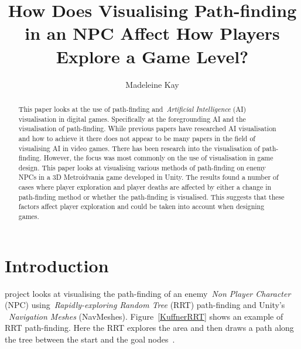 \documentclass[journal]{IEEEtran}
\begin{document}
	\title{ How Does Visualising Path-finding in an NPC Affect How Players Explore a Game Level?}
	\author{Madeleine Kay}
	
	
	\maketitle
	
	\begin{abstract}
		This paper looks at the use of path-finding and~\textit{Artificial Intelligence} (AI) visualisation in digital games.   Specifically at the foregrounding AI and the visualisation of path-finding. 
		While previous papers have researched AI visualisation and how to achieve it there does not appear to be many papers in the field of visualising AI in video games.  There has been research into the visualisation of path-finding. However, the focus was most commonly on the use of visualisation in game design. 
		This paper looks at visualising various methods of path-finding on enemy NPCs in a 3D Metroidvania game developed in Unity.
		The results found a number of cases where player exploration and player deaths are affected by either a change in path-finding method or whether the path-finding is visualised. This suggests that these factors affect player exploration and could be taken into account when designing games.  
	\end{abstract}
	
	\section{Introduction} \label{introduction}
	 project looks at visualising the path-finding of an enemy~\textit{Non Player Character} (NPC) using~\textit{Rapidly-exploring Random Tree} (RRT) path-finding and Unity's ~\textit{Navigation Meshes} (NavMeshes).  Figure~\ref{KuffnerRRT} shows an example of RRT path-finding. Here the RRT explores the area and then draws a path along the tree between the start and the goal nodes~\cite{Kuffner2000}. 
	
\end{document}
